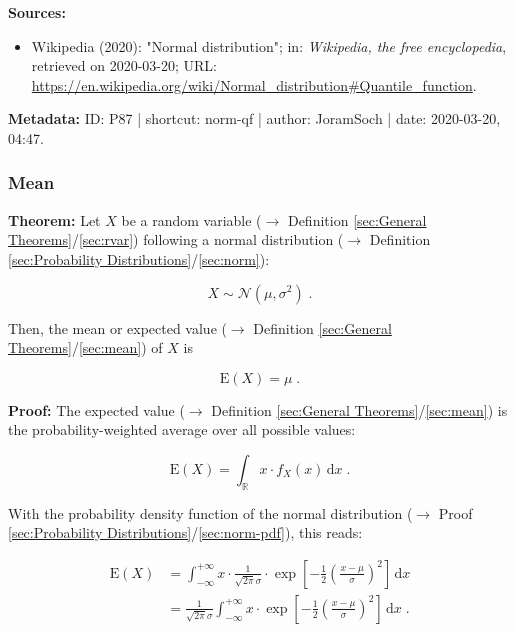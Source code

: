 \documentclass[a4paper,12pt,twoside]{book}
\begin{document}
\vspace{1em}
\textbf{Sources:}
\begin{itemize}
\item Wikipedia (2020): "Normal distribution"; in: \textit{Wikipedia, the free encyclopedia}, retrieved on 2020-03-20; URL: \url{https://en.wikipedia.org/wiki/Normal_distribution#Quantile_function}.
\end{itemize}


\vspace{1em}
\textbf{Metadata:} ID: P87 | shortcut: norm-qf | author: JoramSoch | date: 2020-03-20, 04:47.
\vspace{1em}



\subsubsection[\textbf{Mean}]{Mean} \label{sec:norm-mean}
\setcounter{equation}{0}

\textbf{Theorem:} Let $X$ be a random variable ($\rightarrow$ Definition \ref{sec:General Theorems}/\ref{sec:rvar}) following a normal distribution ($\rightarrow$ Definition \ref{sec:Probability Distributions}/\ref{sec:norm}):

\begin{equation} \label{eq:norm-mean-norm}
X \sim \mathcal{N}(\mu, \sigma^2) \; .
\end{equation}

Then, the mean or expected value ($\rightarrow$ Definition \ref{sec:General Theorems}/\ref{sec:mean}) of $X$ is

\begin{equation} \label{eq:norm-mean-norm-mean}
\mathrm{E}(X) = \mu \; .
\end{equation}


\vspace{1em}
\textbf{Proof:} The expected value ($\rightarrow$ Definition \ref{sec:General Theorems}/\ref{sec:mean}) is the probability-weighted average over all possible values:

\begin{equation} \label{eq:norm-mean-mean}
\mathrm{E}(X) = \int_{\mathbb{R}} x \cdot f_X(x) \, \mathrm{d}x \; .
\end{equation}

With the probability density function of the normal distribution ($\rightarrow$ Proof \ref{sec:Probability Distributions}/\ref{sec:norm-pdf}), this reads:

\begin{equation} \label{eq:norm-mean-norm-mean-s1}
\begin{split}
\mathrm{E}(X) &= \int_{-\infty}^{+\infty} x \cdot \frac{1}{\sqrt{2 \pi} \sigma} \cdot \exp \left[ -\frac{1}{2} \left( \frac{x-\mu}{\sigma} \right)^2 \right] \, \mathrm{d}x \\
&= \frac{1}{\sqrt{2 \pi} \sigma} \int_{-\infty}^{+\infty} x \cdot \exp \left[ -\frac{1}{2} \left( \frac{x-\mu}{\sigma} \right)^2 \right] \, \mathrm{d}x \; .
\end{split}
\end{equation}
\end{document}
